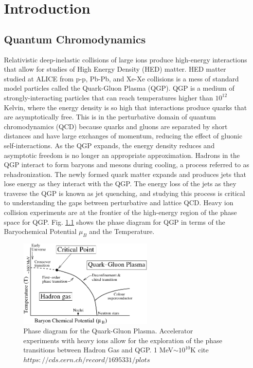 \chapter{Introduction}

\section{Quantum Chromodynamics}
Relativistic deep-inelastic collisions of large ions produce high-energy interactions that allow for studies of High Energy Density (HED) matter. HED matter studied at ALICE from p-p, Pb-Pb, and Xe-Xe collisions is a mess of standard model particles called the Quark-Gluon Plasma (QGP). QGP is a medium of strongly-interacting particles that can reach temperatures higher than $10^{12}$ Kelvin, where the energy density is so high that interactions produce quarks that are asymptotically free. This is in the perturbative domain of quantum chromodynamics (QCD) because quarks and gluons are separated by short distances and have large exchanges of momentum, reducing the effect of gluonic self-interactions.
As the QGP expands, the energy density reduces and asymptotic freedom is no longer an appropriate approximation. Hadrons in the QGP interact to form baryons and mesons during cooling, a process referred to as rehadronization. The newly formed quark matter expands and produces jets that lose energy as they interact with the QGP. The energy loss of the jets as they traverse the QGP is known as jet quenching, and studying this process is critical to understanding the gaps between perturbative and lattice QCD. Heavy ion collision experiments are at the frontier of the high-energy region of the phase space for QGP. Fig. \ref{fig:QGP_Phase_Diagram} shows the phase diagram for QGP in terms of the Baryochemical Potential $\mu_B$ and the Temperature. 

\begin{figure}
    \centering
    \includegraphics[width=0.6\textwidth]{figures/ALICE/QGP_Phase_Diagram.png}
    \caption{Phase diagram for the Quark-Gluon Plasma. Accelerator experiments with heavy ions allow for the exploration of the phase transitions between Hadron Gas and QGP. 1 MeV$\sim 10^{10}$K 
    cite $https://cds.cern.ch/record/1695331/plots$}
    \label{fig:QGP_Phase_Diagram}
\end{figure}



